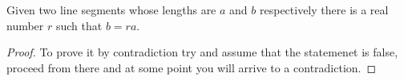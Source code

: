 
\usepackage[utf8]{inputenc}
\usepackage[english]{babel}
 
\usepackage{amsthm}
 

\begin{lemma}
Given two line segments whose lengths are $a$ and $b$ respectively there 
is a real number $r$ such that $b=ra$.
\end{lemma}
 
\begin{proof}
To prove it by contradiction try and assume that the statemenet is false,
proceed from there and at some point you will arrive to a contradiction.
\end{proof}
